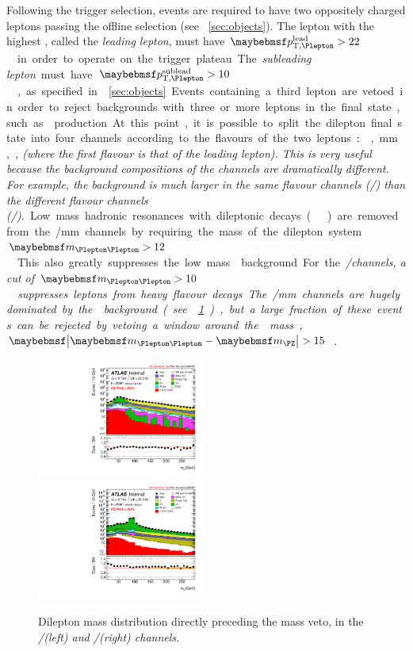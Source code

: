 Following the trigger selection, events are required to have two oppositely charged 
leptons passing the offline selection (see \Section~\ref{sec:objects}). The lepton with 
the highest \pt, called the \textit{leading lepton}, must have 
\unit{$\ptleadlep > 22$}{\GeV} in order to operate on the trigger plateau. The 
\textit{subleading lepton} must have \unit{$\ptsubleadlep > 10$}{\GeV}, as specified in 
\Section~\ref{sec:objects}. Events containing a third lepton are vetoed in order to 
reject backgrounds with three or more leptons in the final state, such as \WZ production.

At this point, it is possible to split the dilepton final state into four channels 
according to the flavours of the two leptons: \ee, \mm, \em, \me (where the first flavour 
is that of the leading lepton). This is very useful because the background compositions 
of the channels are dramatically different. For example, the \DY background is much 
larger in the same flavour channels (\ee/\mm) than the different flavour channels 
(\em/\me).

Low mass hadronic resonances with dileptonic decays (\eg \PJpsi) are removed from the 
\ee/\mm channels by requiring the mass of the dilepton system \unit{$\mll > 12$}{\GeV}. 
This also greatly suppresses the low mass \DY background. For the \em/\me channels, 
a cut of \unit{$\mll > 10$}{\GeV} suppresses leptons from heavy flavour decays. The 
\ee/\mm channels are hugely dominated by the \DY background (see 
\Figure~\ref{fig:sel:mll}), but a large fraction of these events can be rejected by 
vetoing a window around the \PZ mass, \unit{$\mods{\mll - \mZ} > 15$}{\GeV}.

\begin{figure}
	\includegraphics[width=0.495\textwidth]{tex/selection/emme_CutMll_Mll_mh125_log}
	\hfill
	\includegraphics[width=0.495\textwidth]{tex/selection/eemm_CutMll_Mll_mh125_log}
	\caption{Dilepton mass distribution directly preceding the \PZ mass veto, in the 
	\em/\me (left) and \ee/\mm (right) channels. }
	\label{fig:sel:mll}
\end{figure}



